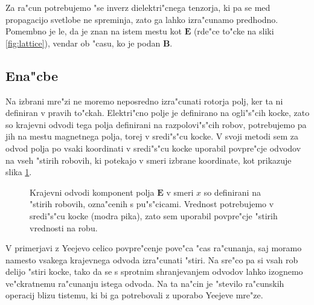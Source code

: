 \documentclass[a4paper,10pt]{article}
\renewcommand{\vec}{\mathbf}
\newcommand{\E}{\vec E}
\newcommand{\B}{\vec B}
\begin{document}
Za ra"cun potrebujemo "se inverz dielektri"cnega tenzorja, ki pa se med propagacijo svetlobe ne spreminja, zato ga lahko izra"cunamo predhodno. 
Pomembno je le, da je znan na istem mestu kot $\E$ (rde"ce to"cke na sliki \ref{fig:lattice}), vendar ob "casu, ko je podan $\B$. 

\subsection{Ena"cbe}

Na izbrani mre"zi ne moremo neposredno izra"cunati rotorja polj, ker ta ni definiran v pravih to"ckah. 
Elektri"cno polje je definirano na ogli"s"cih kocke, zato so krajevni odvodi tega polja definirani na razpolovi"s"cih robov, potrebujemo pa jih na mestu magnetnega polja, torej v sredi"s"cu kocke. 
V svoji metodi sem za odvod polja po vsaki koordinati v sredi"s"cu kocke uporabil povpre"cje odvodov na vseh "stirih robovih, ki potekajo v smeri izbrane koordinate, kot prikazuje slika \ref{fig:lattice-derivatives}. 

\begin{figure}[h]
\centering
 \caption{
 Krajevni odvodi komponent polja $\E$ v smeri $x$ so definirani na "stirih robovih, ozna"cenih s pu"s"cicami. 
 Vrednost potrebujemo v sredi"s"cu kocke (modra pika), zato sem uporabil povpre"cje "stirih vrednosti na robu. 
 }
 \label{fig:lattice-derivatives}
\end{figure}

V primerjavi z Yeejevo celico povpre"cenje pove"ca "cas ra"cunanja, saj moramo namesto vsakega krajevnega odvoda izra"cunati "stiri. 
Na sre"co pa si vsah rob delijo "stiri kocke, tako da se s sprotnim shranjevanjem odvodov lahko izognemo ve"ckratnemu ra"cunanju istega odvoda. 
Na ta na"cin je "stevilo ra"cunskih operacij blizu tistemu, ki bi ga potrebovali z uporabo Yeejeve mre"ze. 
\end{document}
